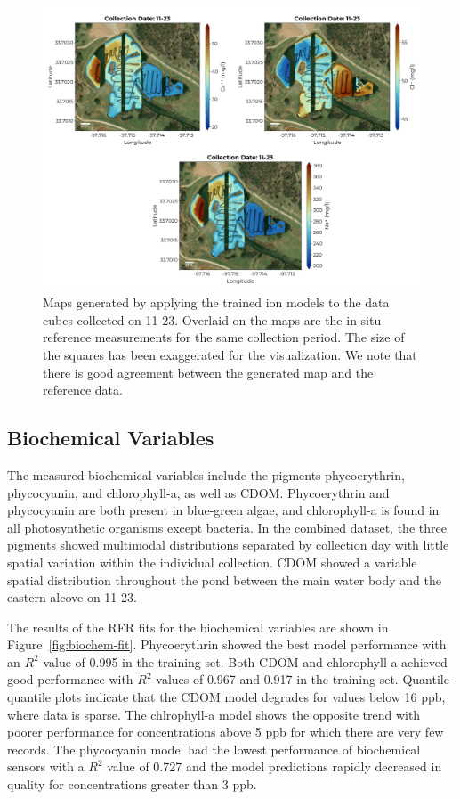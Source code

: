 \documentclass[remotesensing,article,submit,pdftex,moreauthors]{Definitions/mdpi}
\begin{document}
\begin{figure}
\centering
\includegraphics[width=\columnwidth]{paper/figures/results/maps/ions.pdf}
\caption{Maps generated by applying the trained ion models to the data cubes collected on 11-23. Overlaid on the maps are the in-situ reference measurements for the same collection period. The size of the squares has been exaggerated for the visualization. We note that there is good agreement between the generated map and the reference data. \label{fig:map-ions}}
\end{figure}  

\newpage

\subsection{Biochemical Variables}

The measured biochemical variables include the pigments phycoerythrin, phycocyanin, and chlorophyll-a, as well as CDOM. Phycoerythrin and phycocyanin are both present in blue-green algae, and chlorophyll-a is found in all photosynthetic organisms except bacteria. In the combined dataset, the three pigments showed multimodal distributions separated by collection day with little spatial variation within the individual collection. CDOM showed a variable spatial distribution throughout the pond between the main water body and the eastern alcove on 11-23.

The results of the RFR fits for the biochemical variables are shown in Figure~\ref{fig:biochem-fit}. Phycoerythrin showed the best model performance with an $R^2$ value of 0.995 in the training set. Both CDOM and chlorophyll-a achieved good performance with $R^2$ values of 0.967 and 0.917 in the training set. Quantile-quantile plots indicate that the CDOM model degrades for values below 16 ppb, where data is sparse. The chlrophyll-a model shows the opposite trend with poorer performance for concentrations above 5 ppb for which there are very few records. The phycocyanin model had the lowest performance of biochemical sensors with a $R^2$ value of 0.727 and the model predictions rapidly decreased in quality for concentrations greater than 3 ppb. 
\end{document}
